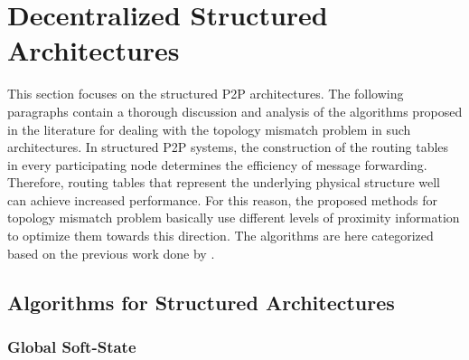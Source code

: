 \section{Decentralized Structured Architectures}
\label{section:structured}

This section focuses on the structured P2P architectures. The following
paragraphs contain a thorough discussion and analysis of the algorithms proposed
in the literature for dealing with the topology mismatch problem in such
architectures. In structured P2P systems, the construction of the routing tables
in every participating node determines the efficiency of message forwarding.
Therefore, routing tables that represent the underlying physical structure well
can achieve increased performance. For this reason, the proposed methods for
topology mismatch problem basically use different levels of proximity
information to optimize them towards this direction. The algorithms are here
categorized based on the previous work done by \cite{CDHR2002,CDCR2002,RSS2002}.

\subsection{Algorithms for Structured Architectures}


\subsubsection{Global Soft-State}


